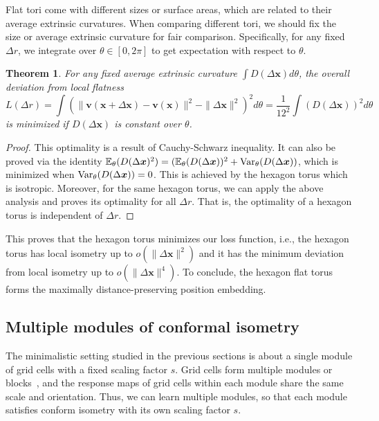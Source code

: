 \documentclass{article}
\def\vv{{\bm{v}}}
\def\vx{{\bm{x}}}
\newtheorem{theorem}{Theorem}
\begin{document}
Flat tori come with different sizes or surface areas, which are related to their average extrinsic curvatures. When comparing different tori, we should fix the size or average extrinsic curvature for fair comparison. 
Specifically, for any fixed $\Delta r$, we integrate over $\theta \in [0, 2\pi]$ to get expectation with respect to $\theta$. 
\begin{theorem}
For any fixed average extrinsic curvature $\int D(\Delta \vx) d \theta$, the overall deviation from local flatness  
\begin{equation}
  L(\Delta r) = \int (\|\vv(\vx+\Delta \vx) - \vv(\vx)\|^2 - \|\Delta \vx\|^2)^2 d\theta = \frac{1}{12^2} \int (D(\Delta \vx))^2 d\theta
\end{equation}
 is minimized if $D(\Delta \vx)$ is constant over $\theta$. 
\end{theorem}
\begin{proof}
This optimality is a result of Cauchy-Schwarz inequality. It can also be proved via the identity $\mathbb{E}_\theta(D(\Delta \vx)^2) = (\mathbb{E}_\theta(D(\Delta \vx))^2 + {\rm Var}_\theta(D(\Delta \vx))$, which is minimized when ${\rm Var}_\theta(D(\Delta \vx)) = 0$.  This is achieved by the hexagon torus which is isotropic. Moreover, for the same hexagon torus, we can apply the above analysis and proves its optimality for all $\Delta r$. That is, the optimality of a hexagon torus is independent of $\Delta r$.
\end{proof}
This proves that the hexagon torus minimizes our loss function, i.e., the hexagon torus has local isometry up to $o(\|\Delta \vx\|^2)$ and it has the minimum deviation from local isometry up to $o(\|\Delta \vx\|^4)$. To conclude, the hexagon flat torus forms the maximally distance-preserving position embedding. 


\subsection{Multiple modules of conformal isometry} \label{sec:multiple module}

The minimalistic setting studied in the previous sections is about a single module of grid cells with a fixed scaling factor $s$. Grid cells form multiple modules or blocks~\citep{Barry2007experience,stensola2012entorhinal}, and the response maps of grid cells within each module share the same scale and orientation. Thus, we can learn multiple modules, so that each module satisfies conform isometry with its own scaling factor $s$. 
\end{document}
